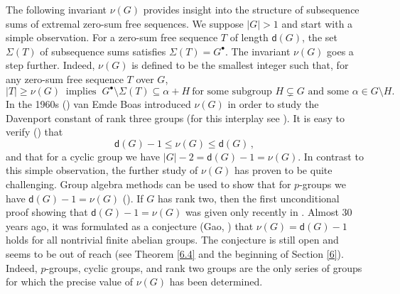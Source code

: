 \documentclass[a4paper, 10pt]{amsart}
\theoremstyle{plain}
\theoremstyle{definition}
\numberwithin{equation}{section}
\begin{document}
The following invariant $\nu (G)$ provides insight into  the structure of subsequence sums of  extremal zero-sum free sequences. We suppose $|G|>1$ and start with a 
simple observation.
For a zero-sum free sequence $T$ of length $\mathsf d (G)$, the  set $\Sigma (T)$ of subsequence sums satisfies $\Sigma (T) = G^{\bullet}$. The invariant $\nu (G)$ goes a step further. Indeed, $\nu (G)$  is defined
to be the smallest integer such that, for any zero-sum free sequence $T$ over $G$,
\begin{equation} \label{def-nu(G)}
|T|\geq \nu(G)  \ \mbox{ implies } \ G^{\bullet} \setminus \Sigma (T) \subseteq \alpha+H \ \mbox {for some  subgroup $H  \subsetneq G$ and some $\alpha\in G\setminus H$}.
\end{equation}
In the 1960s (\cite[page 15]{Em69a}) van Emde Boas introduced $\nu (G)$   in order to study the Davenport constant of rank three groups (for this interplay see \cite{Ga00b}). It is easy to verify (\cite[Proposition 3.2.5]{Ge-Gr-Zh26a}) that 
\begin{equation} \label{basic-inequ-1}
\mathsf d (G) -1 \le \nu (G) \le \mathsf d (G) \,,
\end{equation}
and  that for a cyclic group we have $|G|-2=\mathsf d (G)-1= \nu (G)$. In contrast to this simple observation, the further study of $\nu (G)$ has proven to be quite challenging. Group algebra methods can be used to show that for $p$-groups we have $\mathsf d (G)-1=\nu (G)$ (\cite[Theorem 5.5.9]{Ge-HK06a}). If $G$ has rank two, then the first unconditional proof showing that $\mathsf d (G)-1= \nu (G)$ was  given only recently in \cite[Theorem 3.4.11]{Ge-Gr-Zh26a}.  Almost 30 years ago, it was formulated as a conjecture (Gao, \cite[Section 3]{Ga00b}) that $\nu (G) = \mathsf d (G)-1$ holds for all nontrivial finite abelian groups. The conjecture is still open and seems to be out of reach (see Theorem \ref{6.4} and the beginning of Section \ref{6}). Indeed, $p$-groups, cyclic groups, and rank two groups are the only series of groups  for which the precise value of $\nu (G)$ has been determined.
\end{document}
